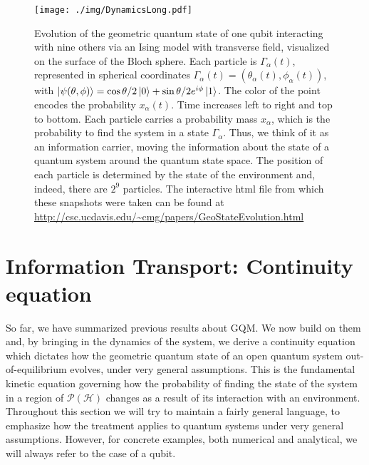 \documentclass[%
 reprint,
 superscriptaddress,
 aps,
 pra,
]{revtex4-2}
\newcommand{\PH}{\mathcal{P}(\mathcal{H})}
\theoremstyle{definition}
\begin{document}
\begin{figure*}[t!]
\centering
\texttt{[image: ./img/DynamicsLong.pdf]}
\caption{Evolution of the geometric quantum state of one qubit interacting with 
	nine others via an Ising model with transverse field, visualized on the surface of the Bloch
	sphere. Each particle is $\Gamma_\alpha(t)$, represented in spherical coordinates 
	$\Gamma_\alpha(t) = \left( \theta_\alpha(t),\phi_\alpha(t)\right)$, with $\ket{\psi(\theta,\phi)} = 
	\cos \theta/2 \ket{0}+ \sin \theta/2 e^{i\phi}\ket{1}$. The color of the point encodes the 
	probability $x_\alpha(t)$. Time increases left to right and top to bottom. Each particle
	carries a probability mass $x_\alpha$, which is the probability to find the system in a 
	state $\Gamma_\alpha$. Thus, we think of it as an information carrier, moving the 
	information about the state of a quantum system around the quantum state space.
	The position of each particle is determined by the state of the environment and, indeed, 
	there are $2^9$ particles. The interactive html file from which these snapshots were
	taken can be found at \url{http://csc.ucdavis.edu/~cmg/papers/GeoStateEvolution.html}
	}
\label{fig:gqs_dynamics}
\end{figure*}


\section{Information Transport: Continuity equation}
\label{sec:IT}

So far, we have summarized previous results about GQM. We now build on them 
and, by bringing in the dynamics of the system, we derive 
a continuity equation which dictates how the geometric quantum state of an open
quantum system out-of-equilibrium evolves, under very general assumptions. This is 
the fundamental kinetic equation governing how the probability of finding the state 
of the system in a region of $\PH$ changes as a result of its interaction with an environment. 
Throughout this section we will try to maintain a fairly general language, to emphasize
how the treatment applies to quantum systems under very general assumptions. However, 
for concrete examples, both numerical and analytical, we will always refer to the case of a qubit.
\end{document}
